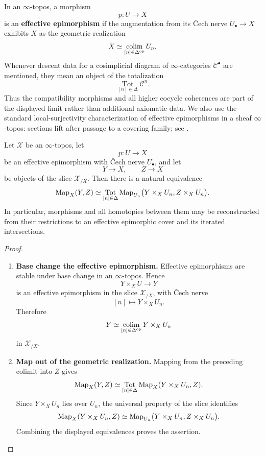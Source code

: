 \begin{convention}
\label{conv:spectral-effective-epimorphisms}
In an \(\infty\)-topos, a morphism
\[
    p:U\longrightarrow X
\]
is an \textbf{effective epimorphism} if the augmentation from its \v{C}ech
nerve \(U_\bullet\to X\) exhibits \(X\) as the geometric realization
\[
    X
    \simeq
    \operatorname*{colim}_{[n]\in\Delta^{\mathrm{op}}}U_n.
\]
Whenever descent data for a cosimplicial diagram of \(\infty\)-categories
\(\mathcal C^\bullet\) are mentioned, they mean an object of the totalization
\[
    \operatorname*{Tot}_{[n]\in\Delta}\mathcal C^n.
\]
Thus the compatibility morphisms and all higher cocycle coherences are part of
the displayed limit rather than additional axiomatic data. We also use the
standard local-surjectivity characterization of effective epimorphisms in a
sheaf \(\infty\)-topos: sections lift after passage to a covering family; see
\cite{LurieSAG}.
\end{convention}

\begin{lemma}
\label{lem:mapping-descent-effective-epimorphism}
Let \(\mathcal X\) be an \(\infty\)-topos, let
\[
    p:U\longrightarrow X
\]
be an effective epimorphism with \v{C}ech nerve \(U_\bullet\), and let
\[
    Y\longrightarrow X,
    \qquad
    Z\longrightarrow X
\]
be objects of the slice \(\mathcal X_{/X}\). Then there is a natural
equivalence
\[
    \operatorname{Map}_X(Y,Z)
    \simeq
    \operatorname*{Tot}_{[n]\in\Delta}
    \operatorname{Map}_{U_n}
    \bigl(
        Y\times_XU_n,
        Z\times_XU_n
    \bigr).
\]
In particular, morphisms and all homotopies between them may be reconstructed
from their restrictions to an effective epimorphic cover and its iterated
intersections.
\end{lemma}

\begin{proof}
\leavevmode
\begin{enumerate}[label=\textup{(\arabic*)}]
    \item \textbf{Base change the effective epimorphism.}
    Effective epimorphisms are stable under base change in an
    \(\infty\)-topos. Hence
    \[
        Y\times_XU\longrightarrow Y
    \]
    is an effective epimorphism in the slice \(\mathcal X_{/X}\), with
    \v{C}ech nerve
    \[
        [n]\longmapsto Y\times_XU_n.
    \]
    Therefore
    \[
        Y
        \simeq
        \operatorname*{colim}_{[n]\in\Delta^{\mathrm{op}}}
        Y\times_XU_n
    \]
    in \(\mathcal X_{/X}\).

    \item \textbf{Map out of the geometric realization.}
    Mapping from the preceding colimit into \(Z\) gives
    \[
        \operatorname{Map}_X(Y,Z)
        \simeq
        \operatorname*{Tot}_{[n]\in\Delta}
        \operatorname{Map}_X(Y\times_XU_n,Z).
    \]
    Since \(Y\times_XU_n\) lies over \(U_n\), the universal property of the
    slice identifies
    \[
        \operatorname{Map}_X(Y\times_XU_n,Z)
        \simeq
        \operatorname{Map}_{U_n}
        \bigl(
            Y\times_XU_n,
            Z\times_XU_n
        \bigr).
    \]
    Combining the displayed equivalences proves the assertion.
\end{enumerate}
\end{proof}

